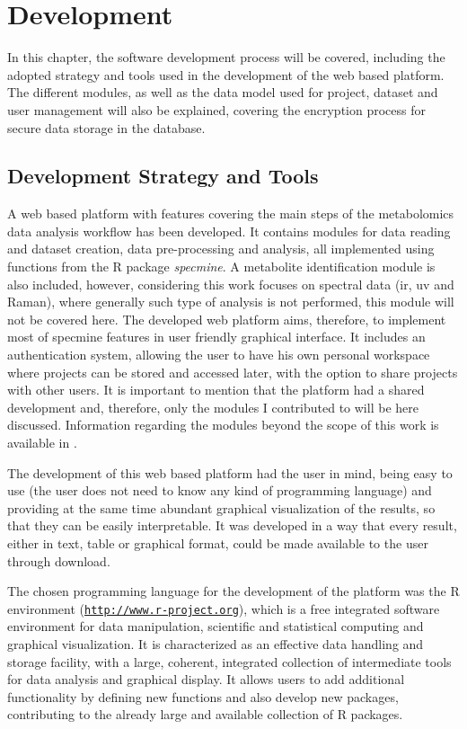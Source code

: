 
\chapter{Development} \label{development}

In this chapter, the software development process will be covered, including the adopted strategy and tools used in the development of the web based platform. The different modules, as well as the data model used for project, dataset and user management will also be explained, covering the encryption process for secure data storage in the database.


\section{Development Strategy and Tools}

A web based platform with features covering the main steps of the metabolomics data analysis workflow has been developed. It contains modules for data reading and dataset creation, data pre-processing and analysis, all implemented using functions from the R package \textit{specmine}. A metabolite identification module is also included, however, considering this work focuses on spectral data (\gls{ir}, \gls{uv} and Raman), where generally such type of analysis is not performed, this module will not be covered here. The developed web platform aims, therefore, to implement most of specmine features in user friendly graphical interface. It includes an authentication system, allowing the user to have his own personal workspace where projects can be stored and accessed later, with the option to share projects with other users. It is important to mention that the platform had a shared development and, therefore, only the modules I contributed to will be here discussed. Information regarding the modules beyond the scope of this work is available in \cite{sara}.

The development of this web based platform had the user in mind, being easy to use (the user does not need to know any kind of programming language) and providing at the same time abundant graphical visualization of the results, so that they can be easily interpretable. It was developed in a way that every result, either in text, table or graphical format, could be made available to the user through download. 

The chosen programming language for the development of the platform was the R environment (\href{http://www.r-project.org}{\nolinkurl{http://www.r-project.org}}), which is a free integrated software environment for data manipulation, scientific and statistical computing and graphical visualization. It is characterized as an effective data handling and storage facility, with a large, coherent, integrated collection of intermediate tools for data analysis and graphical display. It allows users to add additional functionality by defining new functions and also develop new packages, contributing to the already large and available collection of R packages. 

